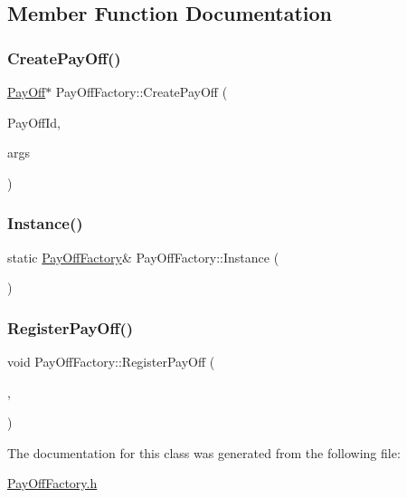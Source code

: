 \subsection{Member Function Documentation}
\hypertarget{classPayOffFactory_af0d9f45e311a22ccac37b3e79c9cb42a}{}\label{classPayOffFactory_af0d9f45e311a22ccac37b3e79c9cb42a} 
\subsubsection{\texorpdfstring{Create\+Pay\+Off()}{CreatePayOff()}}
{\footnotesize\ttfamily \hyperlink{classPayOff}{Pay\+Off}$\ast$ Pay\+Off\+Factory\+::\+Create\+Pay\+Off (\begin{DoxyParamCaption}\item[{string}]{Pay\+Off\+Id,  }\item[{const \hyperlink{classMJArray}{M\+J\+Array} \&}]{args }\end{DoxyParamCaption})}

\hypertarget{classPayOffFactory_ab591be8c5a73e452159a0944810d912e}{}\label{classPayOffFactory_ab591be8c5a73e452159a0944810d912e} 
\subsubsection{\texorpdfstring{Instance()}{Instance()}}
{\footnotesize\ttfamily static \hyperlink{classPayOffFactory}{Pay\+Off\+Factory}\& Pay\+Off\+Factory\+::\+Instance (\begin{DoxyParamCaption}{ }\end{DoxyParamCaption})\hspace{0.3cm}{\ttfamily [static]}}

\hypertarget{classPayOffFactory_a0dc1f59f3a0c0bd1534bd80fc4ab87ee}{}\label{classPayOffFactory_a0dc1f59f3a0c0bd1534bd80fc4ab87ee} 
\subsubsection{\texorpdfstring{Register\+Pay\+Off()}{RegisterPayOff()}}
{\footnotesize\ttfamily void Pay\+Off\+Factory\+::\+Register\+Pay\+Off (\begin{DoxyParamCaption}\item[{string}]{,  }\item[{\hyperlink{classPayOffFactory_ad2e3f0111b56ef662d95592074625e52}{Create\+Pay\+Off\+Function}}]{ }\end{DoxyParamCaption})}



The documentation for this class was generated from the following file\+:\begin{DoxyCompactItemize}
\item 
\hyperlink{PayOffFactory_8h}{Pay\+Off\+Factory.\+h}\end{DoxyCompactItemize}
